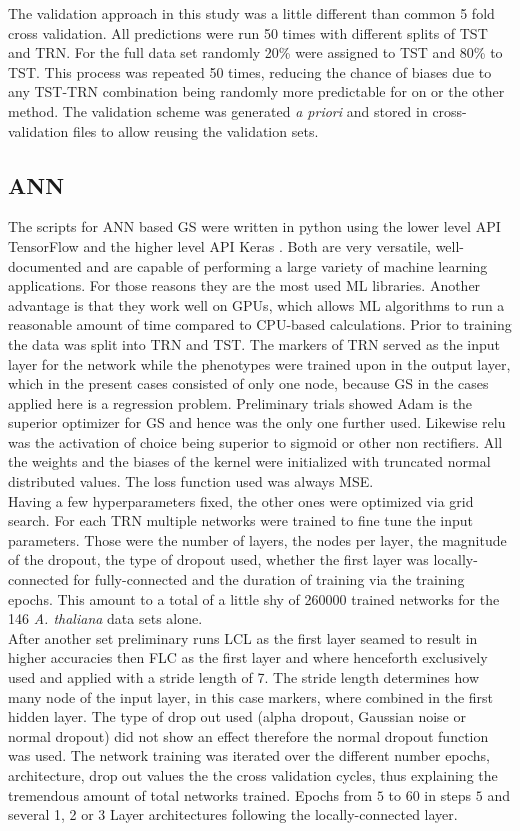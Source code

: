 The validation approach in this study was a little different than common 5 fold cross validation. All
predictions were run 50 times with different splits of TST and TRN. For the full data set randomly 20\% were
assigned to TST and 80\% to TST. This process was repeated 50 times, reducing the chance of biases due to any
TST-TRN combination being randomly more predictable for on or the other method. The validation scheme was
generated \textit{a priori} and stored in cross-validation files to allow reusing the validation sets.

\subsection{ANN}
The scripts for ANN based GS were written in python using the lower level API TensorFlow \cite{TF2016} and the
higher level API Keras \cite{keras2015}. Both are very versatile, well-documented and are capable of
performing a large variety of machine learning applications. For those reasons they are the most used ML
libraries. Another advantage is that they work well on GPUs, which allows ML algorithms to run a reasonable
amount of time compared to CPU-based calculations. Prior to training the data was split into TRN and TST. The
markers of TRN served as the input layer for the network while the phenotypes were trained upon in the output
layer, which in the present cases consisted of only one node, because GS in the cases applied here is a
regression problem. Preliminary trials showed Adam is the superior optimizer for GS and hence was the only one
further used. Likewise relu was the activation of choice being superior to sigmoid or other non
rectifiers. All the weights and the biases of the kernel were initialized with truncated normal distributed
values. The loss function used was always MSE. \\
Having a few hyperparameters fixed, the other ones were optimized via grid search. For each TRN multiple
networks were trained to fine tune the input parameters. Those were the number of layers, the nodes per layer,
the magnitude of the dropout, the type of dropout used, whether the first layer was locally-connected for
fully-connected and the duration of training via the training epochs. This amount to a total of a little shy
of 260000 trained networks for the 146
\textit{A. thaliana} data sets alone. \\
After another set preliminary runs LCL as the first layer seamed to result in higher accuracies then FLC as
the first layer and where henceforth exclusively used and applied with a stride length of 7. The stride length
determines how many node of the input layer, in this case markers, where combined in the first hidden
layer. The type of drop out used (alpha dropout, Gaussian noise or normal dropout) did not show an effect
therefore the normal dropout function was used. The network training was iterated over the different number
epochs, architecture, drop out values the the cross validation cycles, thus explaining the tremendous amount
of total networks trained. Epochs from $5$ to $60$ in steps $5$ and several 1, 2 or 3 Layer architectures
following the locally-connected layer.

